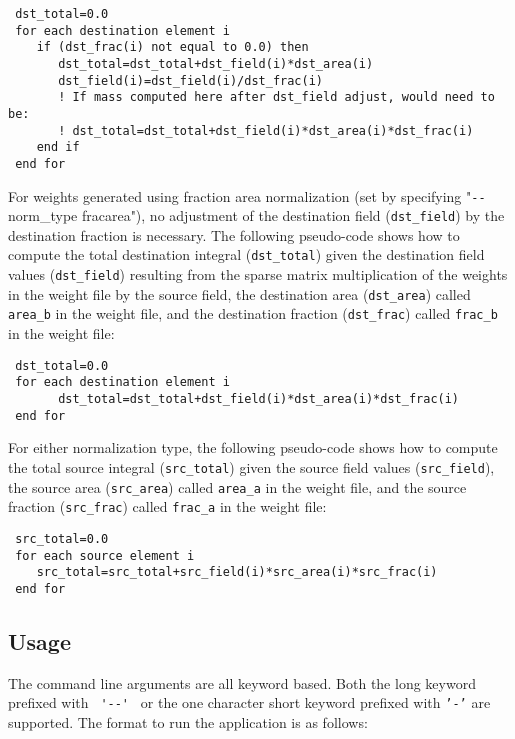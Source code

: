 \begin{verbatim}
 dst_total=0.0
 for each destination element i
    if (dst_frac(i) not equal to 0.0) then
       dst_total=dst_total+dst_field(i)*dst_area(i)
       dst_field(i)=dst_field(i)/dst_frac(i)
       ! If mass computed here after dst_field adjust, would need to be:
       ! dst_total=dst_total+dst_field(i)*dst_area(i)*dst_frac(i)
    end if
 end for
\end{verbatim}

For weights generated using fraction area normalization (set by specifying "\verb+--+norm\_type fracarea"), no adjustment of the destination field ({\tt dst\_field}) by the destination fraction is necessary. The following pseudo-code shows how to compute the total destination integral ({\tt dst\_total}) given the destination field values ({\tt dst\_field}) resulting
 from the sparse matrix multiplication of the weights in the weight file by the source field, the destination area ({\tt dst\_area}) called {\tt area\_b} in the
weight file, and the destination fraction ({\tt dst\_frac}) called {\tt frac\_b} in the weight file: 

\begin{verbatim}
 dst_total=0.0
 for each destination element i
       dst_total=dst_total+dst_field(i)*dst_area(i)*dst_frac(i)
 end for
\end{verbatim}

For either normalization type, the following pseudo-code shows how to compute the total source integral ({\tt src\_total}) given the source field values ({\tt src\_field}), the source area ({\tt src\_area}) called {\tt area\_a} in the weight file, and the source fraction ({\tt src\_frac}) called {\tt frac\_a} in the weight file:

\begin{verbatim}
 src_total=0.0
 for each source element i
    src_total=src_total+src_field(i)*src_area(i)*src_frac(i)
 end for
\end{verbatim}


\subsection{Usage}\label{sec:regridusage}

The command line arguments are all keyword based.  Both the long keyword prefixed with \verb+ '--' + or the
one character short keyword prefixed with {\tt '-'} are supported.  The format to run the application is
as follows:

